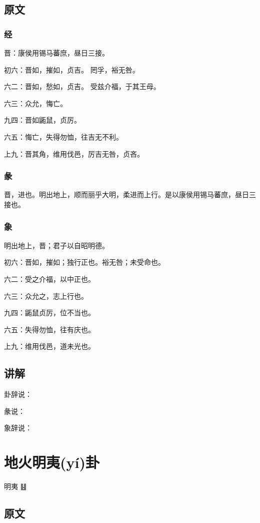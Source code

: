 \documentclass[12pt,oneside]{book}
\begin{document}
\section{原文}

\subsection{经}
晋：康侯用锡马蕃庶，昼日三接。

初六：晋如，摧如，贞吉。 罔孚，裕无咎。

六二：晋如，愁如，贞吉。 受兹介福，于其王母。

六三：众允，悔亡。

九四：晋如鼫鼠，贞厉。

六五：悔亡，失得勿恤，往吉无不利。

上九：晋其角，维用伐邑，厉吉无咎，贞吝。

\subsection{彖}
晋，进也。明出地上，顺而丽乎大明，柔进而上行。是以康侯用锡马蕃庶，昼日三接也。

\subsection{象}
明出地上，晋；君子以自昭明德。

初六：晋如，摧如；独行正也。裕无咎；未受命也。

六二：受之介福，以中正也。

六三：众允之，志上行也。

九四：鼫鼠贞厉，位不当也。

六五：失得勿恤，往有庆也。

上九：维用伐邑，道未光也。

\section{讲解}
卦辞说：

彖说：

象辞说：

\chapter{地火明夷(yí)卦}
明夷 {\Large ䷣}

\section{原文}
\end{document}
